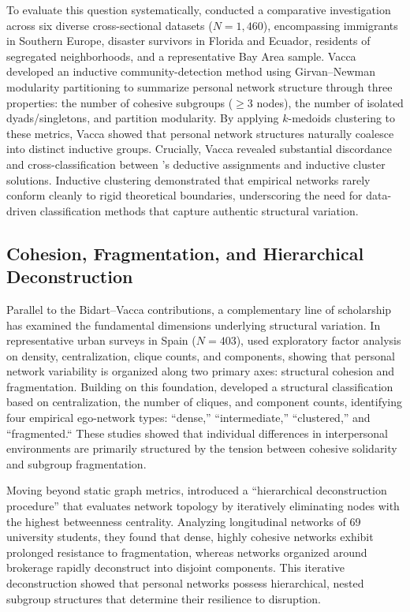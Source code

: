 \documentclass[12pt]{article}
\begin{document}
To evaluate this question systematically, \citet{vacca2020structure} conducted a comparative investigation across six diverse cross-sectional datasets ($N = 1{,}460$), encompassing immigrants in Southern Europe, disaster survivors in Florida and Ecuador, residents of segregated neighborhoods, and a representative Bay Area sample. Vacca developed an inductive community-detection method using Girvan--Newman modularity partitioning to summarize personal network structure through three properties: the number of cohesive subgroups ($\ge 3$ nodes), the number of isolated dyads/singletons, and partition modularity. By applying $k$-medoids clustering to these metrics, Vacca showed that personal network structures naturally coalesce into distinct inductive groups. Crucially, Vacca revealed substantial discordance and cross-classification between \citeauthor{bidart2018personal}'s deductive assignments and inductive cluster solutions. Inductive clustering demonstrated that empirical networks rarely conform cleanly to rigid theoretical boundaries, underscoring the need for data-driven classification methods that capture authentic structural variation.

\subsection{Cohesion, Fragmentation, and Hierarchical Deconstruction}

Parallel to the Bidart--Vacca contributions, a complementary line of scholarship has examined the fundamental dimensions underlying structural variation. In representative urban surveys in Spain ($N = 403$), \citet{mayajariego2015living} used exploratory factor analysis on density, centralization, clique counts, and components, showing that personal network variability is organized along two primary axes: structural cohesion and fragmentation. Building on this foundation, \citet{mayajariego2021building} developed a structural classification based on centralization, the number of cliques, and component counts, identifying four empirical ego-network types: ``dense,'' ``intermediate,'' ``clustered,'' and ``fragmented.`` These studies showed that individual differences in interpersonal environments are primarily structured by the tension between cohesive solidarity and subgroup fragmentation.

Moving beyond static graph metrics, \citet{mayajariego2023use} introduced a ``hierarchical deconstruction procedure'' that evaluates network topology by iteratively eliminating nodes with the highest betweenness centrality. Analyzing longitudinal networks of 69 university students, they found that dense, highly cohesive networks exhibit prolonged resistance to fragmentation, whereas networks organized around brokerage rapidly deconstruct into disjoint components. This iterative deconstruction showed that personal networks possess hierarchical, nested subgroup structures that determine their resilience to disruption.
\end{document}
